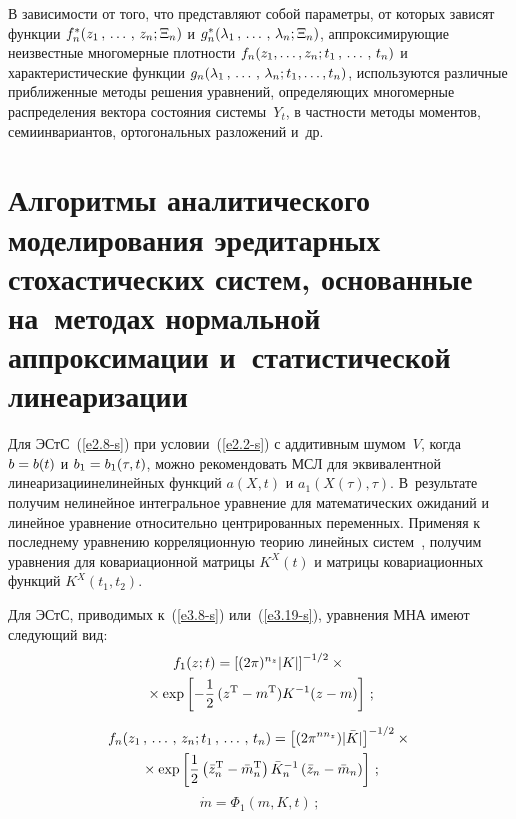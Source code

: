 \begin{multicols}{2}
В зависимости от того, что представляют собой параметры, от
которых зависят функции $f_n^* (z_1\,,\,\ldots\,,\, z_n;\Xi_n)$ и $g_n^*
(\lambda_1\,,\,\ldots\,,\, \lambda_n;\Xi_n)$, аппроксимирующие неизвестные
многомерные плотности $f_n (z_1,  \ldots,z_n; t_1 \,,\,\ldots\,,\, t_n)$ и
характеристические функции $g_n (\lambda_1\,,\,\ldots\,,\, \lambda_n; t_1,\ldots,t_n)$,
используются различные приближенные методы решения
 уравнений, определяющих многомерные
распределения вектора со\-сто\-яния сис\-те\-мы~$Y_t$, в частности методы
моментов, семиинвариантов, ортогональных разложений и~др.


\section{Алгоритмы аналитического моделирования эредитарных стохастических
систем, основанные на~методах нормальной аппроксимации и~статистической линеаризации}


Для ЭСтС~(\ref{e2.8-s}) при условии~(\ref{e2.2-s}) с аддитивным шумом~$V$, 
когда  $b\hm=b(t)$ и $b_1\hm=b_1 (\tau, t)$, можно рекомендовать МСЛ для 
эквивалентной линеаризации\linebreak нелинейных функций $a(X,t)$ и $a_1 (X(\tau),\tau)$. 
В~результате получим нелинейное интегральное уравнение для математических ожиданий 
и линейное уравнение относительно центрированных переменных. Применяя к последнему 
уравнению корреляционную теорию линейных сис\-тем~\cite{4-s, 5-s, 8-s}, 
получим уравнения для ковариационной матрицы  $K^X(t)$ и матрицы ковариационных 
функций $K^X (t_1, t_2)$.

Для ЭСтС, приводимых к~(\ref{e3.8-s}) или~(\ref{e3.19-s}), уравнения МНА имеют следующий вид:
\begin{multline*}
    f_1(z;t) =\left[ (2\pi)^{n_z} |K|\right]^{-1/2} \times{}\\
    {}\times \exp \left[ -\displaystyle\frac{\displaystyle 1\mathstrut}{\displaystyle 2\mathstrut}\, 
    (z^{\mathrm{T}}- m^{\mathrm{T}}) K^{-1} (z-m)\right]\,;
    \end{multline*}
    
    \vspace*{-12pt}
    
    
\begin{multline}
f_n (z_1\,,\,\ldots\,,\, z_n;t_1\,,\,\ldots\,,\, t_n) =\left[ (2\pi^{nn_z}) |\bar K|\right]^{-1/2} \times{}\\
{}\times
\exp \left[ \displaystyle\frac{\displaystyle 1\mathstrut}{\displaystyle 2\mathstrut} \left(\bar z_n^{\mathrm{T}} -\bar m_n^{\mathrm{T}}\right) \bar K_n^{-1} 
\left(\bar z_n- \bar m_n\right)\right]\,;\label{e5.1-s}
\end{multline}
\begin{equation}
\dot m =\Phi_1 (m,K,t)\,;\label{e5.2-s}
\end{equation}


\end{multicols}
